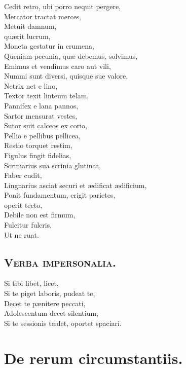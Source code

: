 \documentclass[12pt, twocolumn]{memoir}
\begin{document}
Cedit retro, ubi porro nequit pergere,\\
Mercator tractat merces,\\
Metuit damnum,\\
quærit lucrum,\\
Moneta gestatur in crumena,\\
Queniam pecunia, quæ debemus, solvimus,\\
Emimus et vendimus caro aut vili,\\
Nummi sunt diversi, quisque sue valore,\\
Netrix net e lino,\\
Textor texit linteum telam,\\
Pannifex e lana pannos,\\
Sartor mensurat vestes,\\
Sutor suit calceos ex corio,\\
Pellio e pellibus pellicea,\\
Restio torquet restim,\\
Figulus fingit fidelias,\\
Scriniarius sua scrinia glutinat,\\
Faber cudit,\\
Lingnarius asciat securi et ædificat ædificium,\\
Ponit fundamentum, erigit parietes,\\
operit tecto,\\
Debile non est firmum,\\
Fulcitur fulcris,\\
Ut ne ruat.\\

\section*{\textsc{Verba impersonalia.}}

Si tibi libet, licet,\\
Si te piget laboris, pudeat te,\\
Decet te pænitere peccati,\\
Adolescentum decet silentium,\\
Si te sessionis tædet, oportet spaciari.\\

\chapter{De rerum circumstantiis.}
\end{document}
